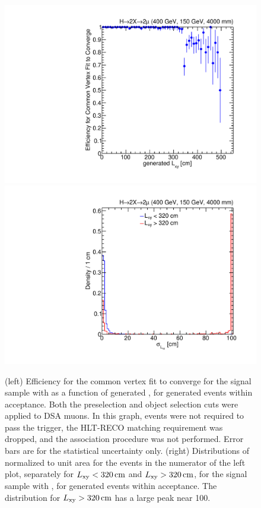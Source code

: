 \begin{figure}[htpb]
  \centering
  \includegraphics[width=\DSquareWidth]{figures/displaced/VFE_Lxy_2Mu2J_400_150_4000.pdf}
  \hspace*{-2em}
  \includegraphics[width=\DSquareWidth]{figures/displaced/LESSMORE_LxyErr_2Mu2J_400_150_4000.pdf}
  \caption{(left) Efficiency for the common vertex fit to converge for the \twoMu signal sample with  as a function of generated \Lxy, for generated events within acceptance. Both the preselection and object selection cuts were applied to DSA muons. In this graph, events were not required to pass the trigger, the HLT-RECO matching requirement was dropped, and the \DSAToPAT association procedure was not performed. Error bars are for the statistical uncertainty only. (right) Distributions of \LxyErr normalized to unit area for the events in the numerator of the left plot, separately for $L_{\mathrm{xy}} < 320\,\text{cm}$ and $L_{\mathrm{xy}} > 320\,\text{cm}$, for the \twoMu signal sample with , for generated events within acceptance. The distribution for $L_{\mathrm{xy}} > 320\,\text{cm}$ has a large peak near 100\cm.}
  \label{fig:dd:VertexFitAnomalies}
\end{figure}

